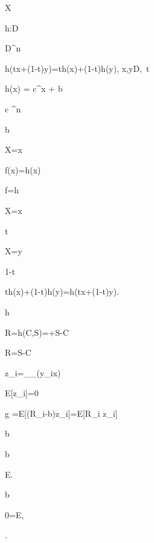 
X


h:D\to{}


D\subseteq{}^n


h(tx+(1-t)y)=th(x)+(1-t)h(y), \quad \forall x,y\in D,\ t\in[0,1]


h(x) = c^\top x + b


c \in {}^n


b \in {}


X=x


f(x)=h(x)


f=h


X=x


t


X=y


1-t


th(x)+(1-t)h(y)=h(tx+(1-t)y).


h


R=h(C,S)=\alpha+\beta S-\lambda C


\alpha




R=S-\lambda C


z_i=\nabla_\theta\log\pi_\theta(y_i\mid x)


\mathbb E[z_i]=0


g =\mathbb E[(R_i-b)z_i]=\mathbb E[R_i z_i]


b


b


\mathbb E\left[(R_i-b)^2\|z_i\|^2\right].


b


0=\mathbb E,


.